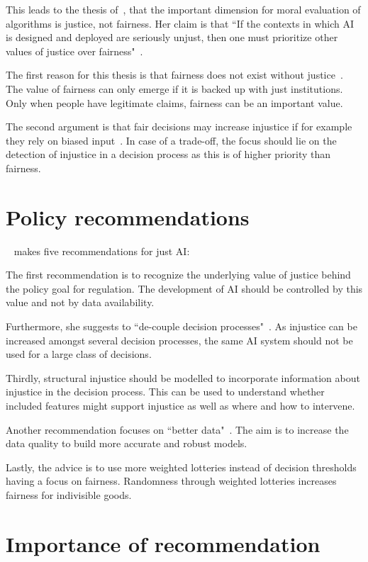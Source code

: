 This leads to the thesis of~\cite{vredenburgh}, that the important dimension for moral evaluation of algorithms is justice, not fairness.
Her claim is that ``If the contexts in which AI is designed and deployed are seriously unjust, then one must prioritize other values of justice over fairness"~\parencite[][19]{vredenburgh}.

The first reason for this thesis is that fairness does not exist without justice~\parencite[][19]{vredenburgh}.
The value of fairness can only emerge if it is backed up with just institutions.
Only when people have legitimate claims, fairness can be an important value.

The second argument is that fair decisions may increase injustice if for example they rely on biased input~\parencite[][19]{vredenburgh}.
In case of a trade-off, the focus should lie on the detection of injustice in a decision process as this is of higher priority than fairness.

\section*{Policy recommendations}

~\cite{vredenburgh} makes five recommendations for just AI:

The first recommendation is to recognize the underlying value of justice behind the policy goal for regulation.
The development of AI should be controlled by this value and not by data availability.

Furthermore, she suggests to ``de-couple decision processes"~\parencite[][22]{vredenburgh}.
As injustice can be increased amongst several decision processes, the same AI system should not be used for a large class of decisions.

Thirdly, structural injustice should be modelled to incorporate information about injustice in the decision process.
This can be used to understand whether included features might support injustice as well as where and how to intervene.

Another recommendation focuses on ``better data"~\parencite[][24]{vredenburgh}.
The aim is to increase the data quality to build more accurate and robust models.

Lastly, the advice is to use more weighted lotteries instead of decision thresholds having a focus on fairness.
Randomness through weighted lotteries increases fairness for indivisible goods.

\section*{Importance of recommendation}

